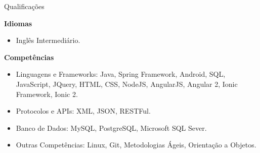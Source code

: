 \documentclass{resume} %
\begin{document}
\begin{rSection}{Qualificações}

\textbf{Idiomas}
\begin{itemize}
	\item Inglês Intermediário.
\end{itemize}

\textbf{Competências}
\begin{itemize}
	\item Linguagens e Frameworks: Java, Spring Framework, Android, SQL, JavaScript, JQuery, HTML, CSS, NodeJS, AngularJS, Angular 2, Ionic Framework, Ionic 2.
	\item Protocolos e APIs: XML, JSON, RESTFul.
	\item Banco de Dados: MySQL, PostgreSQL, Microsoft SQL Sever.
	\item Outras Competências: Linux, Git, Metodologias Ágeis, Orientação a Objetos.
\end{itemize}

\end{rSection}
\end{document}
